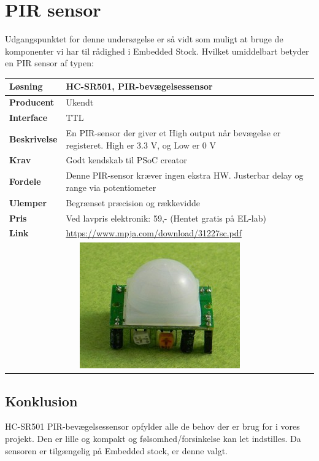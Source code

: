 \section{PIR sensor}

Udgangspunktet for denne undersøgelse er så vidt som muligt at bruge de komponenter vi har til rådighed i Embedded Stock. Hvilket umiddelbart betyder en PIR sensor af typen:

\begin{table}[H] \centering
\begin{tabular}{|p{3cm}|p{11cm}|}
	\hline
	\textbf{Løsning}		
	    & HC-SR501, PIR-bevægelsessensor
	\\ \hline
	\textbf{Producent} 		
	    & Ukendt
	\\ \hline
	\textbf{Interface} 		
	    & TTL 
	\\ \hline
	\textbf{Beskrivelse} 	
	    & En PIR-sensor der giver et High output når bevægelse er registeret. High er 3.3 V, og Low er 0 V
	\\ \hline
	\textbf{Krav} 			
	    & Godt kendskab til PSoC creator
	\\ \hline
	\textbf{Fordele}		
	    & Denne PIR-sensor kræver ingen ekstra HW. Justerbar delay og range via potentiometer
	\\ \hline
	\textbf{Ulemper} 		
	    & Begrænset præcision og rækkevidde
	\\ \hline
	\textbf{Pris} 			
	    & Ved lavpris elektronik: 59,- (Hentet gratis på EL-lab)
	\\ \hline
	\textbf{Link} 			
	    & \url{https://www.mpja.com/download/31227sc.pdf} 
	\\ \hline
	\multicolumn{2}{|c|}{\includegraphics[width=0.3\linewidth]{0_Filer/Figuer/Forudundersoegelse/PIR_sensor_billede.jpg}}
    \\ \hline
\end{tabular}
\end{table}

\subsection{Konklusion}

HC-SR501 PIR-bevægelsessensor opfylder alle de behov der er brug for i vores projekt. Den er lille og kompakt og følsomhed/forsinkelse kan let indstilles. Da sensoren er tilgængelig på Embedded stock, er denne valgt.
